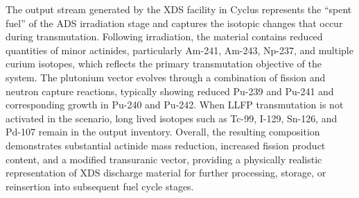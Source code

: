     The output stream generated by the XDS facility in Cyclus represents the “spent fuel” of the ADS irradiation stage and captures the isotopic changes 
    that occur during transmutation. Following irradiation, the material contains reduced quantities of minor actinides, particularly Am-241, Am-243, Np-237, 
    and multiple curium isotopes, which reflects the primary transmutation objective of the system. 
    The plutonium vector evolves through a combination of fission and neutron capture reactions, typically showing reduced Pu-239 and Pu-241 and corresponding growth in Pu-240 and Pu-242. 
    When LLFP transmutation is not activated in the scenario, long lived isotopes such as Tc-99, I-129, Sn-126, and Pd-107 remain in the output inventory. 
    Overall, the resulting composition demonstrates substantial actinide mass reduction, increased fission product content, and a modified transuranic vector, 
    providing a physically realistic representation of XDS discharge material for further processing, storage, or reinsertion into subsequent fuel cycle stages.~\cite{noauthor_proceedings_nodate}


